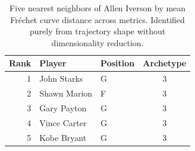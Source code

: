 \begin{table}[htbp]
  \centering\small
  \begin{tabular}{rllc}
    \toprule
    Rank & Player & Position & Archetype \\
    \midrule
    1 & John Starks & G & 3 \\
    2 & Shawn Marion & F & 3 \\
    3 & Gary Payton & G & 3 \\
    4 & Vince Carter & G & 3 \\
    5 & Kobe Bryant & G & 3 \\
    \bottomrule
  \end{tabular}
  \caption{Five nearest neighbors of Allen Iverson by mean Fr\'{e}chet curve distance across metrics. Identified purely from trajectory shape without dimensionality reduction.}
  \label{tab:Allen_Iverson_frechet_curve_neighbors}
\end{table}

